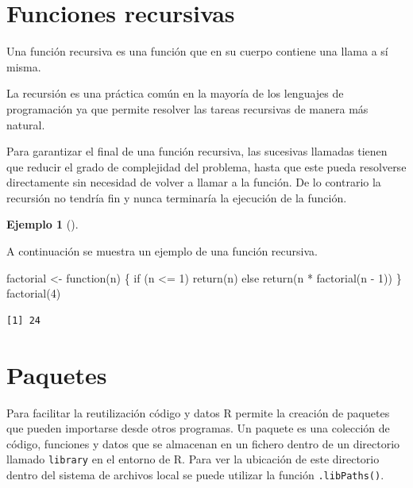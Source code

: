\documentclass[
  a4paper,
]{scrreport}
\newenvironment{Shaded}{\begin{snugshade}}{\end{snugshade}}
\newcommand{\ControlFlowTok}[1]{\textcolor[rgb]{0.00,0.23,0.31}{#1}}
\newcommand{\DecValTok}[1]{\textcolor[rgb]{0.68,0.00,0.00}{#1}}
\newcommand{\FunctionTok}[1]{\textcolor[rgb]{0.28,0.35,0.67}{#1}}
\newcommand{\NormalTok}[1]{\textcolor[rgb]{0.00,0.23,0.31}{#1}}
\newcommand{\OtherTok}[1]{\textcolor[rgb]{0.00,0.23,0.31}{#1}}
\newcommand{\SpecialCharTok}[1]{\textcolor[rgb]{0.37,0.37,0.37}{#1}}
\theoremstyle{definition}
\theoremstyle{definition}
\newtheorem{example}{Ejemplo}[chapter]
\theoremstyle{remark}
\begin{document}
\hypertarget{funciones-recursivas}{%
\section{Funciones recursivas}\label{funciones-recursivas}}

Una función recursiva es una función que en su cuerpo contiene una llama
a sí misma.

La recursión es una práctica común en la mayoría de los lenguajes de
programación ya que permite resolver las tareas recursivas de manera más
natural.

Para garantizar el final de una función recursiva, las sucesivas
llamadas tienen que reducir el grado de complejidad del problema, hasta
que este pueda resolverse directamente sin necesidad de volver a llamar
a la función. De lo contrario la recursión no tendría fin y nunca
terminaría la ejecución de la función.

\leavevmode{}%
\begin{example}[]\label{exm-funcion-recursiva}

A continuación se muestra un ejemplo de una función recursiva.

\begin{Shaded}
\begin{Highlighting}[]
\NormalTok{factorial }\OtherTok{\textless{}{-}} \ControlFlowTok{function}\NormalTok{(n) \{}
  \ControlFlowTok{if}\NormalTok{ (n }\SpecialCharTok{\textless{}=} \DecValTok{1}\NormalTok{) }\FunctionTok{return}\NormalTok{(n)}
  \ControlFlowTok{else} \FunctionTok{return}\NormalTok{(n }\SpecialCharTok{*} \FunctionTok{factorial}\NormalTok{(n }\SpecialCharTok{{-}} \DecValTok{1}\NormalTok{))}
\NormalTok{\}}
\FunctionTok{factorial}\NormalTok{(}\DecValTok{4}\NormalTok{)}
\end{Highlighting}
\end{Shaded}

\begin{verbatim}
[1] 24
\end{verbatim}

\end{example}

\hypertarget{paquetes}{%
\section{Paquetes}\label{paquetes}}

Para facilitar la reutilización código y datos R permite la creación de
paquetes que pueden importarse desde otros programas. Un paquete es una
colección de código, funciones y datos que se almacenan en un fichero
dentro de un directorio llamado \texttt{library} en el entorno de R.
Para ver la ubicación de este directorio dentro del sistema de archivos
local se puede utilizar la función \texttt{.libPaths()}.
\end{document}

